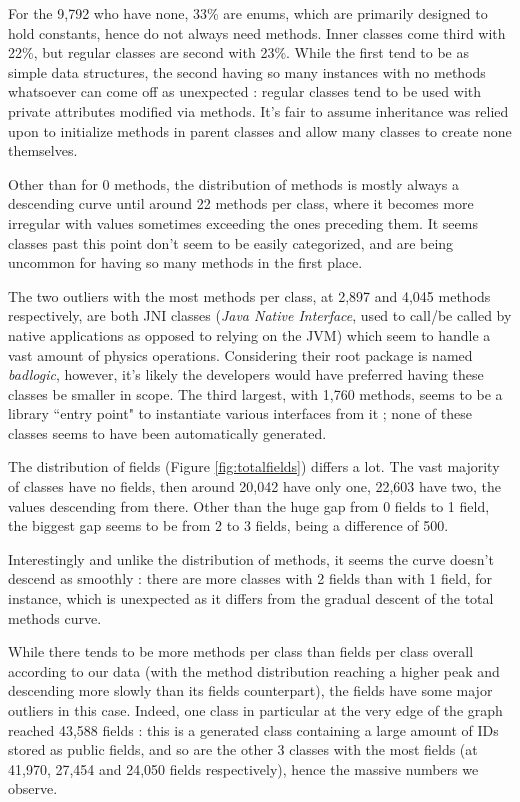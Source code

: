 \documentclass[12pt]{article}
\begin{document}
For the 9,792 who have none, 33\% are enums, which are primarily designed to hold constants, hence do not always need methods. Inner classes come third with 22\%, but regular classes are second with 23\%. While the first tend to be as simple data structures, the second having so many instances with no methods whatsoever can come off as unexpected : regular classes tend to be used with private attributes modified via methods. It's fair to assume inheritance was relied upon to initialize methods in parent classes and allow many classes to create none themselves.

Other than for 0 methods, the distribution of methods is mostly always a descending curve until around 22 methods per class, where it becomes more irregular with values sometimes exceeding the ones preceding them. It seems classes past this point don't seem to be easily categorized, and are being uncommon for having so many methods in the first place.

The two outliers with the most methods per class, at 2,897 and 4,045 methods respectively, are both JNI classes (\textit{Java Native Interface}, used to call/be called by native applications as opposed to relying on the JVM) which seem to handle a vast amount of physics operations. Considering their root package is named \textit{badlogic}, however, it's likely the developers would have preferred having these classes be smaller in scope. The third largest, with 1,760 methods, seems to be a library ``entry point" to instantiate various interfaces from it ; none of these classes seems to have been automatically generated.

\bigskip
The distribution of fields (Figure \ref{fig:totalfields}) differs a lot. The vast majority of classes have no fields, then around 20,042 have only one, 22,603 have two, the values descending from there. Other than the huge gap from 0 fields to 1 field, the biggest gap seems to be from 2 to 3 fields, being a difference of 500. 

Interestingly and unlike the distribution of methods, it seems the curve doesn't descend as smoothly : there are more classes with 2 fields than with 1 field, for instance, which is unexpected as it differs from the gradual descent of the total methods curve.
	
While there tends to be more methods per class than fields per class overall according to our data (with the method distribution reaching a higher peak and descending more slowly than its fields counterpart), the fields have some major outliers in this case. Indeed, one class in particular at the very edge of the graph reached 43,588 fields : this is a generated class containing a large amount of IDs stored as public fields, and so are the other 3 classes with the most fields (at 41,970, 27,454 and 24,050 fields respectively), hence the massive numbers we observe.
\end{document}
